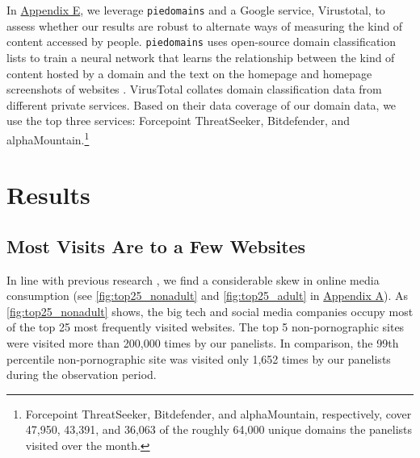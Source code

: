 \documentclass[12pt,twoside]{article}
\begin{document}
In \hyperref[sm:smE]{Appendix E}, we leverage \texttt{piedomains} and a Google service, Virustotal, to assess whether our results are robust to alternate ways of measuring the kind of content accessed by people. \texttt{piedomains} uses open-source domain classification lists to train a neural network that learns the relationship between the kind of content hosted by a domain and the text on the homepage and homepage screenshots of websites \citep{Chintalapati_piedomains_Predict_the_2022}. 
VirusTotal collates domain classification data from different private services. Based on their data coverage of our domain data, we use the top three services: Forcepoint ThreatSeeker, Bitdefender, and alphaMountain.\footnote{Forcepoint ThreatSeeker, Bitdefender, and alphaMountain, respectively, cover 47,950, 43,391, and 36,063 of the roughly 64,000 unique domains the panelists visited over the month.}


\section{Results}\label{sec:results}
\subsection{Most Visits Are to a Few Websites}
\label{subsec:concentration_media_consumption}

In line with previous research \citep{hindman2009myth, Dewan2004-tt}, we find a considerable skew in online media consumption (see \cref{fig:top25_nonadult} and \cref{fig:top25_adult} in \hyperref[sm:smA]{Appendix A}). As \cref{fig:top25_nonadult} shows, the big tech and social media companies occupy most of the top 25 most frequently visited websites. The top 5 non-pornographic sites were visited more than 200,000 times by our panelists. In comparison, the 99th percentile non-pornographic site was visited only 1,652 times by our panelists during the observation period. 
\end{document}
